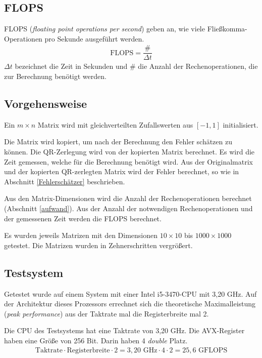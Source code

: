 \subsection{FLOPS}
FLOPS (\textit{floating point operations per second}) geben an, wie viele Fließkomma-Operationen pro Sekunde ausgeführt werden.
\begin{align*}
  \text{FLOPS} = \dfrac{\#}{\Delta t}
\end{align*}
$\Delta t$ bezeichnet die Zeit in Sekunden und $\#$ die Anzahl der Rechenoperationen, die zur Berechnung benötigt werden.

\subsection{Vorgehensweise}

Ein $m \times n$ Matrix wird mit gleichverteilten Zufallswerten aus $[-1,1]$ initialisiert.

Die Matrix wird kopiert, um nach der Berechnung den Fehler schätzen zu können. Die QR-Zerlegung wird von der kopierten Matrix berechnet. Es wird die Zeit gemessen, welche für die Berechnung benötigt wird. 
Aus der Originalmatrix und der kopierten QR-zerlegten Matrix wird der Fehler berechnet, so wie in Abschnitt \ref{Fehlerschätzer} beschrieben.

Aus den Matrix-Dimensionen wird die Anzahl der Rechenoperationen berechnet (Abschnitt \ref{aufwand}).
Aus der Anzahl der notwendigen Rechenoperationen und der gemessenen Zeit werden die FLOPS berechnet.

Es wurden jeweils Matrizen mit den Dimensionen $10 \times 10$ bis $1000 \times 1000$  getestet. Die Matrizen wurden in Zehnerschritten vergrößert.


\subsection{Testsystem}

Getestet wurde auf einem System mit einer Intel i5-3470-CPU mit 3,20 GHz. 
Auf der Architektur dieses Prozessors errechnet sich die theoretische Maximalleistung (\textit{peak performance}) aus der Taktrate mal die Registerbreite mal 2. 


Die CPU des Testsystems hat eine Taktrate von 3,20 GHz.
Die AVX-Register haben eine Größe von 256 Bit.
Darin haben 4 \textit{double} Platz.
\begin{align*}
  \text{Taktrate} \cdot \text{Registerbreite} \cdot 2= 3,20 \text{ GHz} \cdot 4 \cdot 2 = 25,6 \text{ GFLOPS}
\end{align*}



